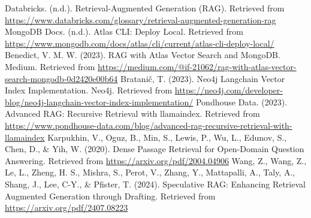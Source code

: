 \documentclass{wseas}
\begin{document}
\begin{thebibliography}{9}
  Databricks. (n.d.). Retrieval-Augmented Generation (RAG). Retrieved
  from
  \url{https://www.databricks.com/glossary/retrieval-augmented-generation-rag}
  MongoDB Docs. (n.d.). Atlas CLI: Deploy Local. Retrieved from
  \url{https://www.mongodb.com/docs/atlas/cli/current/atlas-cli-deploy-local/}
  Benedict, V. M. W. (2023). RAG with Atlas Vector Search and MongoDB.
  Medium. Retrieved from
  \href{https://medium.com/@if-21062/rag-with-atlas-vector-search-mongodb-0d2420e00b64}{https://medium.com/@if-21062/rag-with-atlas-vector-search-mongodb-0d2420e00b64}
  Bratanič, T. (2023). Neo4j Langchain Vector Index Implementation.
  Neo4j. Retrieved from
  \url{https://neo4j.com/developer-blog/neo4j-langchain-vector-index-implementation/}
  Pondhouse Data. (2023). Advanced RAG: Recursive Retrieval with
  llamaindex. Retrieved from
  \url{https://www.pondhouse-data.com/blog/advanced-rag-recursive-retrieval-with-llamaindex}
  Karpukhin, V., Oguz, B., Min, S., Lewis, P., Wu, L., Edunov, S., Chen,
  D., \& Yih, W. (2020). Dense Passage Retrieval for Open-Domain
  Question Answering. Retrieved from
  \url{https://arxiv.org/pdf/2004.04906}
  Wang, Z., Wang, Z., Le, L., Zheng, H. S., Mishra, S., Perot, V.,
  Zhang, Y., Mattapalli, A., Taly, A., Shang, J., Lee, C-Y., \& Pfister,
  T. (2024). Speculative RAG: Enhancing Retrieval Augmented Generation
  through Drafting. Retrieved from
  \url{https://arxiv.org/pdf/2407.08223}

\end{thebibliography}

    
\end{document}
